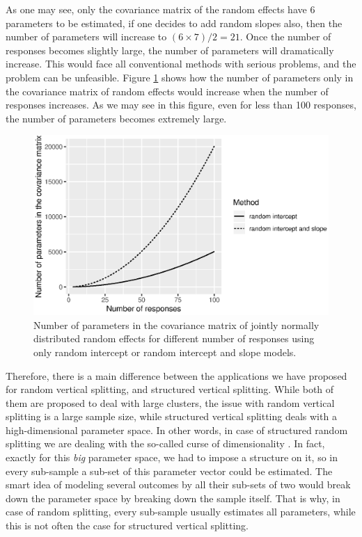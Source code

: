 \documentclass[11pt,a5paper,twoside]{book}
\begin{document}
As one may see, only the covariance matrix of the random effects have $6$ parameters to be estimated, if one decides to add random slopes also, then the number of parameters will increase to $(6\times7)/2 = 21$. Once the number of responses becomes slightly large, the number of parameters will dramatically increase. This would face all conventional methods with serious problems, and the problem can be unfeasible. Figure \ref{fig_strucVert} shows how the number of parameters only in the covariance matrix of random effects would increase when the number of responses increases. As we may see in this figure, even for less than 100 responses, the number of parameters becomes extremely large.

\begin{figure}
\centering
\includegraphics[width=\textwidth]{strucVert.eps}
\caption{Number of parameters in the covariance matrix of jointly normally distributed random effects for different number of responses using only random intercept or random intercept and slope models.} 
\label{fig_strucVert}
\end{figure} 

Therefore, there is a main difference between the applications we have proposed for random vertical splitting, and structured vertical splitting. While both of them are proposed to deal with large clusters, the issue with random vertical splitting is a large sample size, while structured vertical splitting deals with a high-dimensional parameter space. In other words, in case of structured random splitting we are dealing with the so-called curse of dimensionality \citep{donoho2000}. In fact, exactly for this \emph{big} parameter space, we had to impose a structure on it, so in every sub-sample a sub-set of this parameter vector could be estimated. The smart idea of modeling several outcomes by all their sub-sets of two would break down the parameter space by breaking down the sample itself. That is why, in case of random splitting, every sub-sample usually estimates all parameters, while this is not often the case for structured vertical splitting. 
\end{document}

